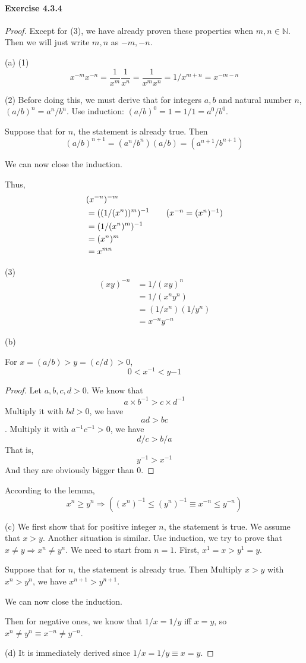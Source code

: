 \paragraph{Exercise 4.3.4} \label{exercise4.3.4}
\begin{proof}
Except for (3),
we have already proven these properties when $m,n \in \mathbb{N}$. Then we will just write $m,n$ as $-m,-n$.

(a)
(1)
\[
x^{-m}x^{-n} = \frac{1}{x^m}\frac{1}{x^n} = \frac{1}{x^mx^n}=1/x^{m+n} = x^{-m-n}
\]

(2)
Before doing this, we must derive that for integers $a,b$ and natural number $n$, $(a/b)^n = a^n/b^n$. Use 
induction: $(a/b)^0 = 1 = 1/1 = a^0/b^0$.

Suppose that for $n$, the statement is already true. Then 
\[
(a/b)^{n+1} = (a^n/b^n)(a/b) = (a^{n+1}/b^{n+1})
\]

We can now close the induction.

Thus, 
\begin{align*}
&(x^{-n})^{-m} \\
&= ((1/(x^n))^m)^{-1} \tag{$x^{-n} = (x^n)^{-1}$} \\
&= (1/(x^n)^m)^{-1} \\
&= (x^n)^m \\
&= x^{mn}
\end{align*}

(3)
\begin{align*}
(xy)^{-n} 
&= 1/(xy)^n \\
&= 1/(x^ny^n) \\
&= (1/x^n) (1/y^n) \\
&= x^{-n}y^{-n}
\end{align*}

(b)
\begin{lem}
For $x = (a/b) >  y = (c/d) > 0$,
\[
0 < x^{-1} < y{-1}
\]
\end{lem}
\begin{proof}
Let $a,b,c,d>0$. We know that
\[
a \times b^{-1} > c \times d^{-1}
\]
Multiply it with $bd>0$, we have
\[
ad>bc
\].
Multiply it with $a^{-1}c^{-1} >0$, we have
\[
d/c>b/a
\]
That is,
\[
y^{-1} > x^{-1}
\]
And they are obviously bigger than $0$.
\end{proof}

According to the lemma,
\[
x^{n} \geq y^{n} \Longrightarrow ((x^{n})^{-1} \leq (y^{n})^{-1} \equiv x^{-n} \leq y^{-n})
\]

(c)
We first show that for positive integer $n$, the statement is true. We assume that $x>y$. Another situation is 
similar.
Use induction, we try to prove that $x\neq y \Longrightarrow x^n \neq y^n$. We need to start from $n=1$. First, 
$x^1=x > y^1=y$. 

Suppose that for $n$, the statement is already true. Then
Multiply $x>y$ with $x^n > y^n$, 
we have $x^{n+1} > y^{n+1}$.

We can now close the induction.

Then for negative ones, we know that $1/x = 1/y$ iff $x=y$, so $x^n \neq y^n \equiv x^{-n} \neq y^{-n}$.

(d)
It is immediately derived since $1/x = 1/y \equiv x=y$.
\end{proof}

